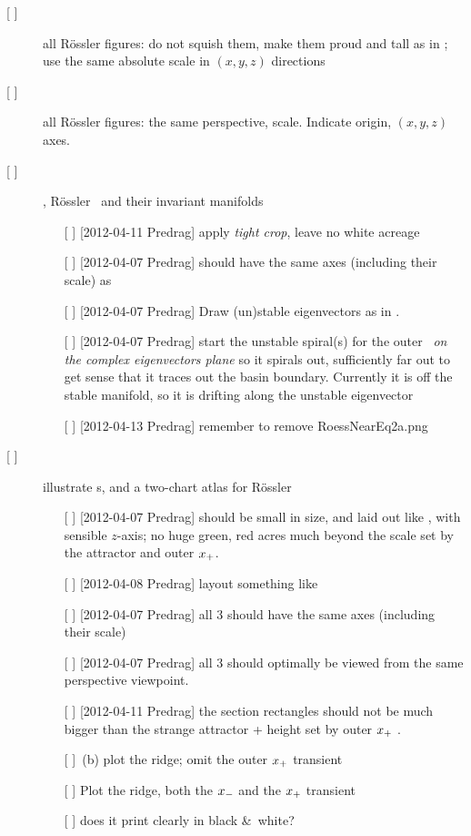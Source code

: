 \begin{description}
\item[{[ ]}] all R\"ossler figures: do not squish them, make them proud
        and tall as in ; use the same absolute scale
        in $(x,y,z)$ directions
\item[{[ ]}] all R\"ossler figures: the same perspective, scale. Indicate origin, $(x,y,z)$ axes.
\item[{[ ]}] ,
        R\"ossler \eqva\ and their invariant manifolds
    \begin{itemize}
        \item[{[ ]}] [2012-04-11 Predrag] apply \emph{tight crop}, leave no white acreage
        \item[{[ ]}] [2012-04-07 Predrag] should have the same axes
            (including their scale) as 
        \item[{[ ]}] [2012-04-07 Predrag] Draw (un)stable eigenvectors as
                in .
        \item[{[ ]}] [2012-04-07 Predrag] start the unstable spiral(s)
            for the outer \eqv\ \emph{on the complex eigenvectors plane}
            so it spirals out, sufficiently far out to get sense that it
            traces out the basin boundary. Currently it is off the stable
            manifold, so it is drifting along the unstable eigenvector
        \item[{[ ]}] [2012-04-13 Predrag] remember to remove RoessNearEq2a.png
    \end{itemize}

\item[{[ ]}]
    illustrate \poincBord s, and a two-chart atlas for R\"ossler
    \begin{itemize}
        \item[{[ ]}] [2012-04-07 Predrag] should be small in size, and laid out like
            , with sensible $z$-axis; no huge green,
            red acres much beyond the scale set by the attractor and
            outer $x_{+}$.
        \item[{[ ]}] [2012-04-08 Predrag] layout something like 
        \item[{[ ]}] [2012-04-07 Predrag] all 3 should have the same axes
            (including their scale)
        \item[{[ ]}] [2012-04-07 Predrag] all 3 should optimally be viewed from the same
            perspective viewpoint.
        \item[{[ ]}] [2012-04-11 Predrag] the section rectangles should
            not be much bigger than the strange attractor + height set by
            outer  $x_{+}$ \eqv.
        \item[{[ ]}] \,(b) plot the ridge; omit the
            outer $x_{+}$ transient
        \item[{[ ]}]  Plot
            the ridge, both the $x_{-}$ and the $x_{+}$ transient
        \item[{[ ]}] does it print clearly in black \&\ white?
    \end{itemize}


\end{description}
